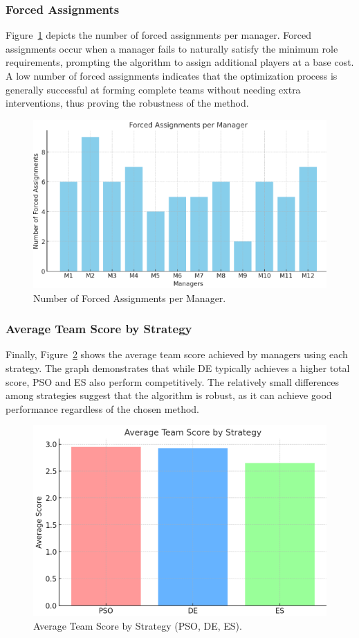 \documentclass[sigconf]{acmart}
\begin{document}
\subsubsection{Forced Assignments}
Figure~\ref{fig:forced_assignments} depicts the number of forced assignments per manager. Forced assignments occur when a manager fails to naturally satisfy the minimum role requirements, prompting the algorithm to assign additional players at a base cost. A low number of forced assignments indicates that the optimization process is generally successful at forming complete teams without needing extra interventions, thus proving the robustness of the method.

\begin{figure}[H]
	\centering
	\includegraphics[width=0.8\linewidth]{plot/forced_assignments.png}
	\caption{Number of Forced Assignments per Manager.}
	\label{fig:forced_assignments}
\end{figure}

\subsubsection{Average Team Score by Strategy}
Finally, Figure~\ref{fig:team_score} shows the average team score achieved by managers using each strategy. The graph demonstrates that while DE typically achieves a higher total score, PSO and ES also perform competitively. The relatively small differences among strategies suggest that the algorithm is robust, as it can achieve good performance regardless of the chosen method.

\begin{figure}[H]
	\centering
	\includegraphics[width=0.8\linewidth]{plot/average_team_score_strategy.png}
	\caption{Average Team Score by Strategy (PSO, DE, ES).}
	\label{fig:team_score}
\end{figure}
\end{document}

